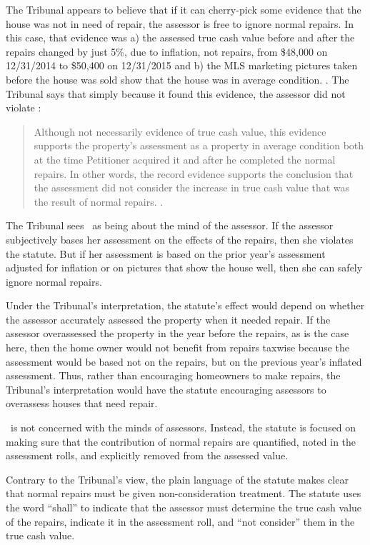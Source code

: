 \documentclass[12pt,\documentclassflag]{michiganCourtOfAppealsBrief}
\begin{document}
The Tribunal appears to believe that if it can cherry-pick some evidence that the house was not in need of repair, the assessor is free to ignore normal repairs.
In this case, that evidence was a) the assessed true cash value before and after the repairs changed by just 5\%, due to inflation, not repairs,
from \$48,000 on 12/31/2014 to \$50,400 on 12/31/2015 and
b) the MLS marketing pictures taken before the house was sold show that the house was in average condition. \reconsiderationDenied[2]. The Tribunal says that simply because it found this evidence, the assessor did not violate \mathieuGast:

\begin{quote}
	Although not necessarily evidence of true cash value, this evidence supports the property's assessment as a property in average condition both at the time Petitioner acquired it and after he completed the normal repairs. In other words, the record evidence supports the conclusion that the assessment did not consider the increase in true cash value that was the result of normal repairs. \reconsiderationDenied[2]. 
\end{quote}
 
The Tribunal sees \mathieuGast\ as being about the mind of the assessor. If the assessor subjectively bases her assessment on the effects of the repairs, then she violates the statute. But if her assessment is based on the prior year's assessment adjusted for inflation or on pictures that show the house well, then she can safely ignore normal repairs.

Under the Tribunal's interpretation, the statute's effect would depend on whether the assessor accurately assessed the property when it needed repair. If the assessor overassessed the property in the year before the repairs, as is the case here, then the home owner would not benefit from repairs taxwise because the assessment would be based not on the repairs, but on the previous year's inflated assessment. Thus, rather than encouraging homeowners to make repairs, the Tribunal's interpretation would have the statute encouraging assessors to overassess houses that need repair.

\mathieuGast\ is not concerned with the minds of assessors.
Instead, the statute is focused on making sure that the contribution of normal repairs are quantified, noted in the assessment rolls, and explicitly removed from the assessed value.

Contrary to the Tribunal's view, the plain language of the statute makes clear that normal repairs must be given non-consideration treatment. The statute uses the word ``shall'' to indicate that the assessor must determine the true cash value of the repairs, indicate it in the assessment roll, and ``not consider'' them in the true cash value.
\end{document}

